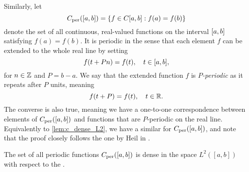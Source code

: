 \documentclass[../thesis.tex]{subfiles}
\begin{document}
Similarly, let 
\begin{equation*}
    C_{\text{per}}([a,b])= \left\{f \in C[a,b]: f(a)=f(b)\right\}
\end{equation*}
denote the set of all continuous, real-valued functions on the interval $[a,b]$ satisfying $f(a)=f(b)$. It is periodic in the sense that each element $f$ can be extended to the whole real line by setting 
\begin{equation*}
    f(t+Pn) = f(t), \quad t\in [a,b],
\end{equation*}
for $n\in \mathbb{Z}$ and $P=b-a$. We say that the extended function $f$ is $P$\emph{-periodic} as it repeats after $P$ units, meaning
\begin{equation*}
    f(t+P) = f(t), \quad t\in \mathbb{R}.
\end{equation*}
The converse is also true, meaning we have a one-to-one correspondence between elements of $C_{\text{per}}([a,b])$ and functions that are $P$-periodic on the real line. %
Equivalently to \cref{lem:c_dense_L2}, we have a similar  for $C_{\text{per}}([a,b])$, and note that the proof closely follows the one by Heil in \cite[p.~228]{heilMetricsNormsInner2018}.  %
\begin{lemma}\label{lem:c_per_dense_c_and_dense_L2}
    The set of all periodic functions $C_{\text{per}}([a,b])$ is dense in the space $L^2([a,b])$ with respect to the \Ltwonorm.
\end{lemma}
\end{document}

